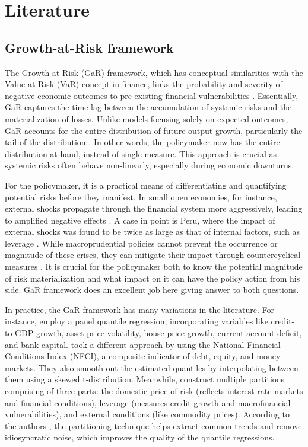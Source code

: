 \section{Literature}
\subsection{Growth-at-Risk framework}
The Growth-at-Risk (GaR) framework, which has conceptual similarities with the Value-at-Risk (VaR) concept in finance, links the probability and severity of negative economic outcomes to pre-existing financial vulnerabilities \citep{imf_gar_2019}. Essentially, GaR captures the time lag between the accumulation of systemic risks and the materialization of losses. Unlike models focusing solely on expected outcomes, GaR accounts for the entire distribution of future output growth, particularly the tail of the distribution \citep{szabo2020}. In other words, the policymaker now has the entire distribution at hand, instead of single measure. This approach is crucial as systemic risks often behave non-linearly, especially during economic downturns.

For the policymaker, it is a practical means of differentiating and quantifying potential risks before they manifest. In small open economies, for instance, external shocks propagate through the financial system more aggressively, leading to amplified negative effects \citep{esrb2021}. A case in point is Peru, where the impact of external shocks was found to be twice as large as that of internal factors, such as leverage \citep{imf_gar_2019}. While macroprudential policies cannot prevent the occurrence or magnitude of these crises, they can mitigate their impact through countercyclical measures \citep{esrb2021}. It is crucial for the policymaker both to know the potential magnitude of risk materialization and what impact on it can have the policy action from his side. GaR framework does an excellent job here giving answer to both questions.

In practice, the GaR framework has many variations in the literature. For instance, \citet{aikman2019} employ a panel quantile regression, incorporating variables like credit-to-GDP growth, asset price volatility, house price growth, current account deficit, and bank capital. \citet{adrian_2019} took a different approach by using the National Financial Conditions Index (NFCI), a composite indicator of debt, equity, and money markets. They also smooth out the estimated quantiles by interpolating between them using a skewed t-distribution. Meanwhile, \citet{imf_gar_2019} construct multiple partitions comprising of three parts: the domestic price of risk (reflects interest rate markets and financial conditions), leverage (measures credit growth and macrofinancial vulnerabilities), and external conditions (like commodity prices). According to the authors \citep{imf_gar_2019}, the partitioning technique helps extract common trends and remove idiosyncratic noise, which improves the quality of the quantile regressions.

